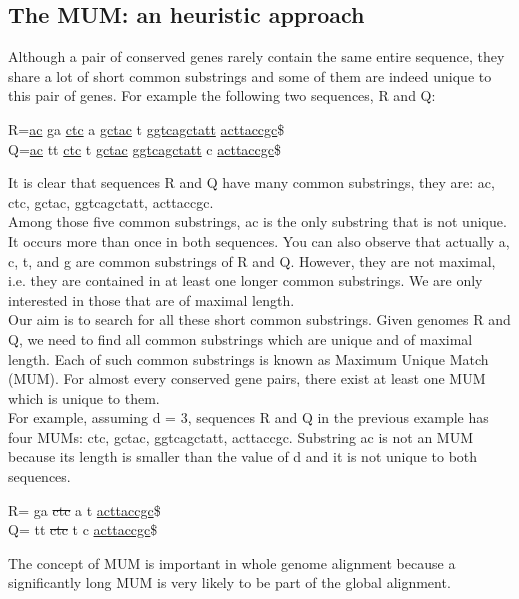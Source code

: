 \documentclass[3p,times]{elsarticle}
\begin{document}
\subsection{The  MUM: an heuristic approach}
Although a pair of conserved genes rarely contain the same entire sequence, they share a lot of short common substrings and some of them are indeed unique to this pair of genes. For example the following two sequences, R and Q:\\
\begin{center}
    R=\underline{ac} ga \underline{ctc} a \underline{gctac} t \underline{ggtcagctatt} \underline{acttaccgc}\$\\
    Q=\underline{ac} tt \underline{ctc} t \underline{gctac} \underline{ggtcagctatt} c \underline{acttaccgc}\$\\
\end{center}
    It is clear that sequences R and Q have many common substrings, they are: ac, ctc, gctac, ggtcagctatt, acttaccgc.\\
Among those five common substrings, ac is the only substring that is not unique. It occurs more than once in both sequences. You can also observe that actually a, c, t, and g are common substrings of R and Q. However, they are not maximal, i.e. they are contained in at least one longer common substrings. We are only interested in those that are of maximal length.\\
Our aim is to search for all these short common substrings. Given genomes R and Q, we need to find all common substrings which are unique and of maximal length. Each of such common substrings is known as Maximum Unique Match (MUM). For almost every conserved gene pairs, there exist at least one MUM which is unique to them.\\
For example, assuming d = 3, sequences R and Q in the previous example has four MUMs: ctc, gctac, ggtcagctatt, acttaccgc. Substring ac is not an MUM because its length is smaller than the value of d and it is not unique to both sequences.
\begin{center}
    R= ga \sout{ctc} a  t  \uline{acttaccgc}\$\\
    Q= tt \sout{ctc} t   c \uline{acttaccgc}\$\\
\end{center}
The concept of MUM is important in whole genome alignment because a significantly long MUM is very likely to be part of the global alignment.
\end{document}
